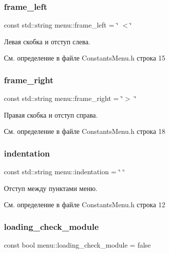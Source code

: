 \subsubsection{\texorpdfstring{frame\+\_\+left}{frame\_left}}
{\footnotesize\ttfamily const std\+::string menu\+::frame\+\_\+left = \char`\"{} $<$\char`\"{}}

Левая скобка и отступ слева. 

См. определение в файле Constants\+Menu.\+h строка 15

\mbox{\label{namespacemenu_a3f786c7ab3caec7dfef9e1fa61b52ae7}} 
\subsubsection{\texorpdfstring{frame\+\_\+right}{frame\_right}}
{\footnotesize\ttfamily const std\+::string menu\+::frame\+\_\+right = \char`\"{}$>$ \char`\"{}}

Правая скобка и отступ справа. 

См. определение в файле Constants\+Menu.\+h строка 18

\mbox{\label{namespacemenu_ac0906d6effd5dc68552a724a3edb9330}} 
\subsubsection{\texorpdfstring{indentation}{indentation}}
{\footnotesize\ttfamily const std\+::string menu\+::indentation = \char`\"{} \char`\"{}}

Отступ между пунктами меню. 

См. определение в файле Constants\+Menu.\+h строка 12

\mbox{\label{namespacemenu_aaea5c70964114a416caa58676ddf8066}} 
\subsubsection{\texorpdfstring{loading\+\_\+check\+\_\+module}{loading\_check\_module}}
{\footnotesize\ttfamily const bool menu\+::loading\+\_\+check\+\_\+module = false}

